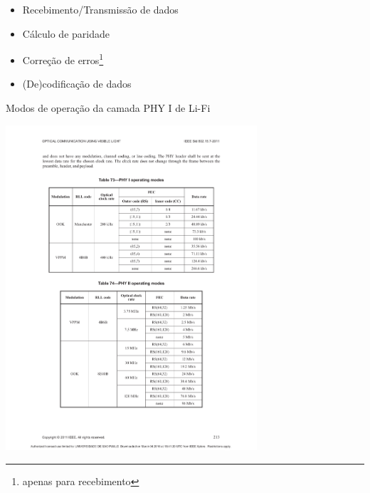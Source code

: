 	\begin{itemize}  
		\item Recebimento/Transmissão de dados
		\item Cálculo de paridade
		\item Correção de erros\footnote{apenas para recebimento}
		\item (De)codificação de dados
	\end{itemize}
	
	\begin{table}[htbp]
		\caption{\label{tab_phy1} Modos de operação da camada PHY I de Li-Fi}

		\centering
		\includegraphics[clip, trim=37mm 151mm 36mm 51mm,  width=0.7\textwidth]{pag213.pdf}
	\end{table}
	
